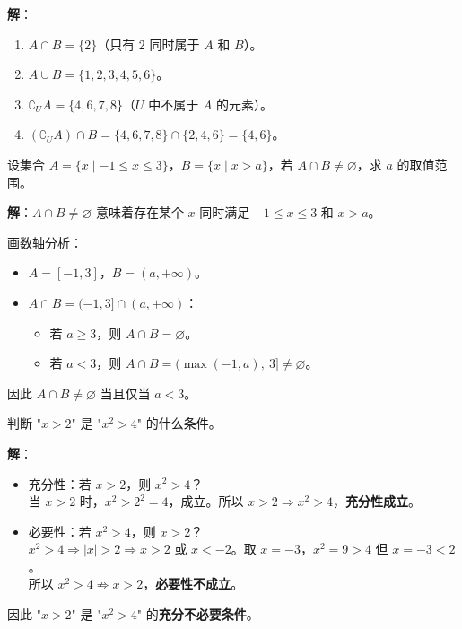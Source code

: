 \documentclass[12pt, a4paper]{ctexart}
\begin{document}
\textbf{解}：
\begin{enumerate}[label=(\arabic*)]
  \item $A \cap B = \{2\}$（只有 $2$ 同时属于 $A$ 和 $B$）。
  \item $A \cup B = \{1, 2, 3, 4, 5, 6\}$。
  \item $\complement_U A = \{4, 6, 7, 8\}$（$U$ 中不属于 $A$ 的元素）。
  \item $(\complement_U A) \cap B = \{4, 6, 7, 8\} \cap \{2, 4, 6\} = \{4, 6\}$。
\end{enumerate}

\begin{examplebox}[【例5】含参数的集合运算]
设集合 $A = \{x \mid -1 \leq x \leq 3\}$，$B = \{x \mid x > a\}$，若 $A \cap B \neq \varnothing$，求 $a$ 的取值范围。
\end{examplebox}

\textbf{解}：$A \cap B \neq \varnothing$ 意味着存在某个 $x$ 同时满足 $-1 \leq x \leq 3$ 和 $x > a$。

画数轴分析：
\begin{itemize}[leftmargin=2em]
  \item $A = [-1, 3]$，$B = (a, +\infty)$。
  \item $A \cap B = (-1, 3] \cap (a, +\infty)$：
    \begin{itemize}
      \item 若 $a \geq 3$，则 $A \cap B = \varnothing$。
      \item 若 $a < 3$，则 $A \cap B = (\max(-1, a),\ 3] \neq \varnothing$。
    \end{itemize}
\end{itemize}
因此 $A \cap B \neq \varnothing$ 当且仅当 $\boxed{a < 3}$。

\begin{examplebox}[【例6】充分必要条件的判断]
判断 "$x > 2$" 是 "$x^2 > 4$" 的什么条件。
\end{examplebox}

\textbf{解}：
\begin{itemize}[leftmargin=2em]
  \item 充分性：若 $x > 2$，则 $x^2 > 4$？\\
    当 $x > 2$ 时，$x^2 > 2^2 = 4$，成立。所以 $x > 2 \Rightarrow x^2 > 4$，\textbf{充分性成立}。
  \item 必要性：若 $x^2 > 4$，则 $x > 2$？\\
    $x^2 > 4 \Rightarrow |x| > 2 \Rightarrow x > 2$ 或 $x < -2$。取 $x = -3$，$x^2 = 9 > 4$ 但 $x = -3 < 2$。\\
    所以 $x^2 > 4 \not\Rightarrow x > 2$，\textbf{必要性不成立}。
\end{itemize}
因此 "$x > 2$" 是 "$x^2 > 4$" 的\textbf{充分不必要条件}。
\end{document}
